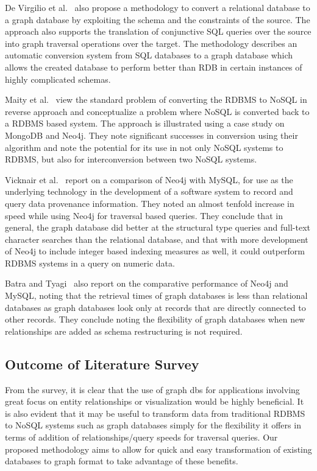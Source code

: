 \documentclass[12pt]{article}
\begin{document}
    De Virgilio et al.~\cite{rdbms2graph} also propose a methodology to convert a relational database to a graph database by exploiting the schema and the constraints of the source. The approach also supports the translation of conjunctive SQL queries over the source into graph traversal operations over the target. The methodology describes an automatic conversion system from SQL databases to a graph database which allows the created database to perform better than RDB in certain instances of highly complicated schemas.

    Maity et al.~\cite{nosql2rdbms} view the standard problem of converting the RDBMS to NoSQL in reverse approach and conceptualize a problem where NoSQL is converted back to a RDBMS based system.  The approach is illustrated using a case study on MongoDB and Neo4j. They note significant successes in conversion using their algorithm and note the potential for its use in not only  NoSQL systems to RDBMS, but also for interconversion between two NoSQL systems.

    Vicknair et al.~\cite{db_comparison} report on a comparison of Neo4j with MySQL, for use as the underlying technology in the development of a software system to record and query data provenance information. They noted an almost tenfold increase in speed while using Neo4j for traversal based queries. They conclude that in general, the graph database did better at the structural type queries and full-text character searches than the relational database, and that with more development of Neo4j to include integer based indexing measures as well, it could outperform RDBMS systems in a query on numeric data.

    Batra and Tyagi~\cite{rgdb_compare} also report on the comparative performance of Neo4j and MySQL, noting that the retrieval times of graph databases is less than relational databases as  graph databases look only at records that are directly connected to other records. They conclude noting the flexibility of graph databases when new relationships are added as schema restructuring is not required.

    \subsection{Outcome of Literature Survey}
    From the survey, it is clear that the use of graph dbs for applications involving great focus on entity relationships or visualization would be highly beneficial. It is also evident that it may be useful to transform data from traditional RDBMS to NoSQL systems such as graph databases simply for the flexibility it offers in terms of addition of relationships/query speeds for traversal queries. Our proposed methodology aims to allow for quick and easy transformation of existing databases to graph format to take advantage of these benefits. 
\end{document}

